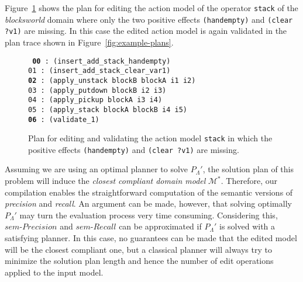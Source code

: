 Figure~\ref{fig:plan-pdistance} shows the plan for editing the action model of the operator {\tt\small stack} of the {\em blocksworld} domain where only the two positive effects {\tt\small (handempty)} and {\tt\small (clear ?v1)} are missing. In this case the edited action model is again validated in the plan trace shown in Figure~\ref{fig:example-plans}.

\begin{figure}[hbt!]
{\footnotesize\tt
  {\bf 00} : (insert\_add\_stack\_handempty)\\
  01 : (insert\_add\_stack\_clear\_var1)\\
  {\bf 02} : (apply\_unstack blockB blockA i1 i2)\\
  03 : (apply\_putdown blockB i2 i3)\\
  04 : (apply\_pickup blockA i3 i4)\\
  05 : (apply\_stack blockA blockB i4 i5)\\
  {\bf 06} : (validate\_1)
}
\caption{\small Plan for editing and validating the action model {\tt\small{stack}} in which the positive effects {\tt\small{(handempty)}} and {\tt\small{(clear ?v1)}} are missing.}
\label{fig:plan-pdistance}
\end{figure}

Assuming we are using an optimal planner to solve $P_{\Lambda}'$, the solution plan of this problem will induce the \emph{closest compliant domain model} $\mathcal{M^*}$. Therefore, our compilation enables the straightforward computation of the semantic versions of \emph{precision} and \emph{recall}. An argument can be made, however, that solving optimally $P_{\Lambda}'$ may turn the evaluation process very time consuming. Considering this, $sem\text{-}Precision$ and $sem\text{-}Recall$ can be approximated if $P_{\Lambda}'$ is solved with a satisfying planner. In this case, no guarantees can be made that the edited model will be the closest compliant one, but a classical planner will always try to minimize the solution plan length and hence the number of edit operations applied to the input model.














